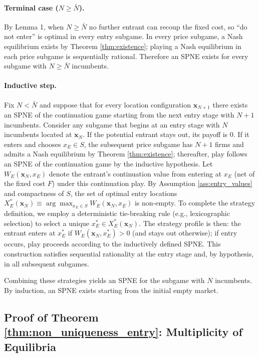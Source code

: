 \documentclass{article}
\begin{document}
\paragraph{Terminal case ($N\ge \bar{N}$).}
By Lemma 1, when $N\ge \bar{N}$ no further entrant can recoup the fixed cost, so ``do not enter'' is optimal in every entry subgame.
In every price subgame, a Nash equilibrium exists by Theorem \ref{thm:existence}; playing a Nash equilibrium in each price subgame is sequentially rational.
Therefore an SPNE exists for every subgame with $N\ge \bar{N}$ incumbents.

\paragraph{Inductive step.}
Fix $N<\bar{N}$ and suppose that for every location configuration $\mathbf{x}_{N+1}$ there exists an SPNE of the continuation game starting from the next entry stage with $N+1$ incumbents.
Consider any subgame that begins at an entry stage with $N$ incumbents located at $\mathbf{x}_N$.
If the potential entrant stays out, its payoff is $0$.
If it enters and chooses $x_E\in S$, the subsequent price subgame has $N+1$ firms and admits a Nash equilibrium by Theorem \ref{thm:existence}; thereafter, play follows an SPNE of the continuation game by the inductive hypothesis.
Let $W_E(\mathbf{x}_N,x_E)$ denote the entrant's continuation value from entering at $x_E$ (net of the fixed cost $F$) under this continuation play.
By Assumption \ref{ass:entry_values} and compactness of $S$, the set of optimal entry locations
$X_E^*(\mathbf{x}_N)\equiv \arg\max_{x_E \in S} W_E(\mathbf{x}_N, x_E)$ is non-empty.
To complete the strategy definition, we employ a deterministic tie-breaking rule (e.g., lexicographic selection) to select a unique $x_E^* \in X_E^*(\mathbf{x}_N)$.
The strategy profile is then: the entrant enters at $x_E^*$ if $W_E(\mathbf{x}_N, x_E^*) > 0$ (and stays out otherwise); if entry occurs, play proceeds according to the inductively defined SPNE. This construction satisfies sequential rationality at the entry stage and, by hypothesis, in all subsequent subgames.

Combining these strategies yields an SPNE for the subgame with $N$ incumbents.
By induction, an SPNE exists starting from the initial empty market.

\subsection{Proof of Theorem \ref{thm:non_uniqueness_entry}: Multiplicity of Equilibria}
\end{document}
